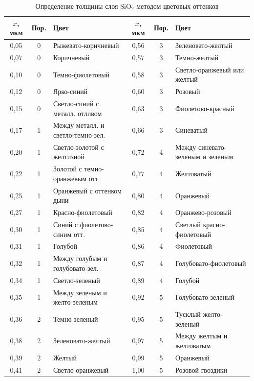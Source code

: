 \documentclass[12pt,a4paper]{article}
\theoremstyle{plain}
\theoremstyle{definition}
\theoremstyle{remark}
\numberwithin{equation}{section}
\begin{document}
\begin{table}[H]
    \centering
    \caption{Определение толщины слоя $\mathrm{SiO}_2$ методом цветовых оттенков}
    \label{tab:color_shades}
    \footnotesize
    \begin{tabularx}{\textwidth}{|c|c|X||c|c|X|}
        \hline
        \textbf{$x$, мкм} & \textbf{Пор.} & \textbf{Цвет} & \textbf{$x$, мкм} & \textbf{Пор.} & \textbf{Цвет} \\
        \hline
        0,05 & 0 & Рыжевато-коричневый & 0,56 & 3 & Зеленовато-желтый \\
        0,07 & 0 & Коричневый & 0,57 & 3 & Темно-желтый \\
        0,10 & 0 & Темно-фиолетовый & 0,58 & 3 & Светло-оранжевый или желтый \\
        0,12 & 0 & Ярко-синий & 0,60 & 3 & Розовый \\
        0,15 & 0 & Светло-синий с металл. отливом & 0,63 & 3 & Фиолетово-красный \\
        0,17 & 1 & Между металл. и светло-темно-зел. & 0,66 & 3 & Синеватый \\
        0,20 & 1 & Светло-золотой с желтизной & 0,72 & 4 & Между синевато-зеленым и зеленым \\
        0,22 & 1 & Золотой с темно-оранжевым отт. & 0,77 & 4 & Желтоватый \\
        0,25 & 1 & Оранжевый с оттенком дыни & 0,80 & 4 & Оранжевый \\
        0,27 & 1 & Красно-фиолетовый & 0,82 & 4 & Оранжево-розовый \\
        0,30 & 1 & Синий с фиолетово-синим отт. & 0,85 & 4 & Светлый красно-фиолетовый \\
        0,31 & 1 & Голубой & 0,86 & 4 & Фиолетовый \\
        0,32 & 1 & Между голубым и голубовато-зел. & 0,87 & 4 & Голубовато-фиолетовый \\
        0,34 & 1 & Светло-зеленый & 0,89 & 4 & Голубой \\
        0,35 & 1 & Между зеленым и желто-зеленым & 0,92 & 5 & Голубовато-зеленый \\
        0,36 & 2 & Темно-зеленый & 0,95 & 5 & Тусклый желто-зеленый \\
        0,38 & 2 & Зеленовато-желтый & 0,97 & 5 & Между желтым и желтоватым \\
        0,39 & 2 & Желтый & 0,99 & 5 & Оранжевый \\
        0,41 & 2 & Светло-оранжевый & 1,00 & 5 & Розовой гвоздики \\

\end{tabularx}
\end{table}
\end{document}
